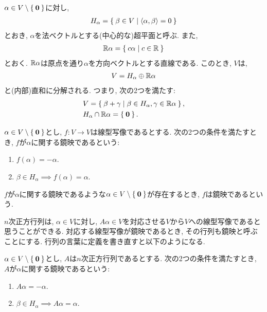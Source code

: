 $\alpha \in V\setminus\Set{\boldsymbol{0}}$に対し,
\begin{align*}
  H_\alpha = \Set{\beta \in V | \Braket{\alpha,\beta}=0}
\end{align*}
とおき, $\alpha$を法ベクトルとする(中心的な)超平面と呼ぶ.
また,
\begin{align*}
  \mathbb{R}\alpha = \Set{c \alpha | c\in \mathbb{R}}
\end{align*}
とおく. $\mathbb{R}\alpha$は原点を通り$\alpha$を方向ベクトルとする直線である.
このとき, $V$は,
\begin{align*}
  V =   H_\alpha \oplus   \mathbb{R}\alpha
\end{align*}
と(内部)直和に分解される.
つまり, 次の2つを満たす:
\begin{align*}
  &V = \Set{ \beta + \gamma | \beta \in H_\alpha, \gamma \in \mathbb{R}\alpha},\\
  &H_\alpha \cap   \mathbb{R}\alpha =\Set{\boldsymbol{0}}.
\end{align*}

\begin{definition}
  $\alpha \in V\setminus\Set{\boldsymbol{0}}$とし,
  $f\colon V\to V$は線型写像であるとする.
  次の2つの条件を満たすとき,
  $f$が$\alpha$に関する鏡映であるという:
  \begin{enumerate}
  \item $f(\alpha)=-\alpha$.
  \item $\beta \in H_\alpha \implies f(\alpha)=\alpha$.    
  \end{enumerate}
  $f$が$\alpha$に関する鏡映であるような$\alpha\in V\setminus\Set{\boldsymbol{0}}$が存在するとき,
  $f$は鏡映であるという.
\end{definition}
$n$次正方行列は,
$\alpha\in V$に対し,
$A\alpha\in V$を対応させる$V$から$V$への線型写像であると思うことができる.
対応する線型写像が鏡映であるとき, その行列も鏡映と呼ぶことにする.
行列の言葉に定義を書き直すと以下のようになる.
\begin{definition}
  $\alpha \in V\setminus\Set{\boldsymbol{0}}$とし,
  $A$は$n$次正方行列であるとする.
  次の2つの条件を満たすとき,
  $A$が$\alpha$に関する鏡映であるという:
  \begin{enumerate}
  \item $A\alpha=-\alpha$.
  \item $\beta \in H_\alpha \implies A\alpha=\alpha$.    
  \end{enumerate}
\end{definition}

